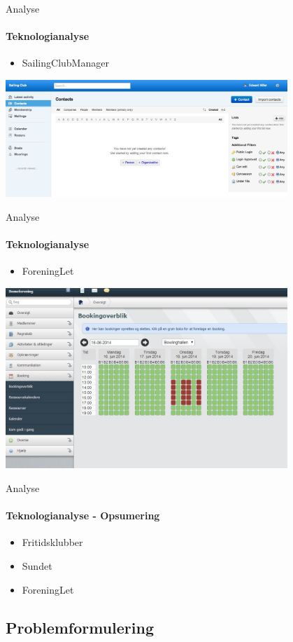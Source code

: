 \begin{frame}{Analyse}
\framesubtitle{Teknologianalyse}
  \begin{itemize}
    \item SailingClubManager
  \end{itemize}
\includegraphics[width=0.8\textwidth]{images/SCM.jpg}
\end{frame}

\begin{frame}{Analyse}
\framesubtitle{Teknologianalyse}
  \begin{itemize}
    \item ForeningLet
  \end{itemize}
        \includegraphics[width=0.8\textwidth]{images/ForeningLet.jpg}
\end{frame}

\begin{frame}{Analyse}
\framesubtitle{Teknologianalyse - Opsumering}
\begin{itemize}
   \item Fritidsklubber
   \item Sundet
   \item ForeningLet
\end{itemize}
\end{frame}

\subsection{Problemformulering}

